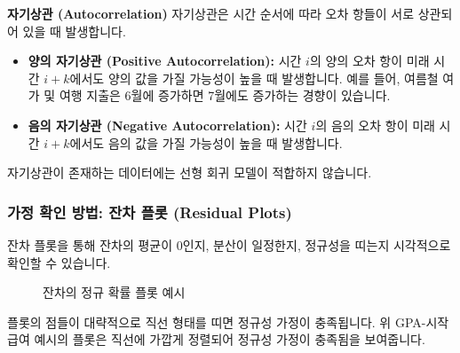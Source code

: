 \documentclass[11pt,a4paper]{book}
\theoremstyle{definition}
\begin{document}
\begin{cautionbox}
\textbf{자기상관 (Autocorrelation)}
자기상관은 시간 순서에 따라 오차 항들이 서로 상관되어 있을 때 발생합니다.
\begin{itemize}
    \item \textbf{양의 자기상관 (Positive Autocorrelation):} 시간 $i$의 양의 오차 항이 미래 시간 $i+k$에서도 양의 값을 가질 가능성이 높을 때 발생합니다. 예를 들어, 여름철 여가 및 여행 지출은 6월에 증가하면 7월에도 증가하는 경향이 있습니다.
    \item \textbf{음의 자기상관 (Negative Autocorrelation):} 시간 $i$의 음의 오차 항이 미래 시간 $i+k$에서도 음의 값을 가질 가능성이 높을 때 발생합니다.
\end{itemize}
자기상관이 존재하는 데이터에는 선형 회귀 모델이 적합하지 않습니다.
\end{cautionbox}

\subsubsection{가정 확인 방법: 잔차 플롯 (Residual Plots)}
잔차 플롯을 통해 잔차의 평균이 0인지, 분산이 일정한지, 정규성을 띠는지 시각적으로 확인할 수 있습니다.

\begin{figure}[h!]
    \centering
    \caption{잔차의 정규 확률 플롯 예시}
    \label{fig:residual_normal_plot}
\end{figure}
\begin{tcolorbox}[colback=lightblue,colframe=darkblue,title={정규성 가정 확인}]
플롯의 점들이 대략적으로 직선 형태를 띠면 정규성 가정이 충족됩니다. 위 GPA-시작 급여 예시의 플롯은 직선에 가깝게 정렬되어 정규성 가정이 충족됨을 보여줍니다.
\end{tcolorbox}
\end{document}
